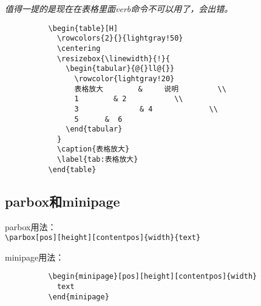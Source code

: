 \documentclass[11pt,oneside]{book}
\begin{document}
        \emph{值得一提的是现在在表格里面verb命令不可以用了，会出错。}

        \begin{Verbatim}
          \begin{table}[H]
            \rowcolors{2}{}{lightgray!50}
            \centering
            \resizebox{\linewidth}{!}{
              \begin{tabular}{@{}ll@{}}
                \rowcolor{lightgray!20}
                表格放大        &     说明         \\
                1        & 2           \\
                3              & 4             \\
                5      &  6
              \end{tabular}
            }
            \caption{表格放大}
            \label{tab:表格放大}
          \end{table}
        \end{Verbatim}


        \begin{table}[H]
          \centering
          \caption{表格放大}
          \label{tab:表格放大}
        \end{table}



        \subsection{parbox和minipage}
        parbox用法：\\
        \verb+\parbox[pos][height][contentpos]{width}{text}+

        minipage用法：
        \begin{Verbatim}
          \begin{minipage}[pos][height][contentpos]{width}
            text
          \end{minipage}
        \end{Verbatim}
\end{document}
